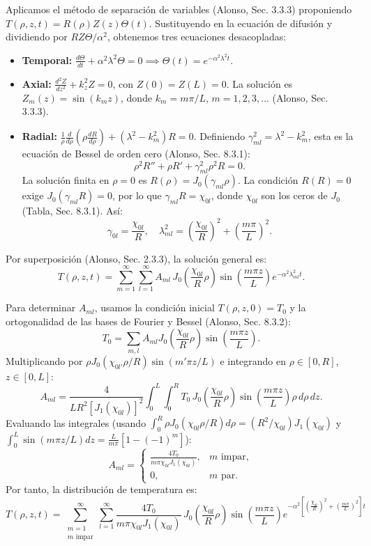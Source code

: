 \documentclass[a4paper]{article}
\begin{document}
Aplicamos el método de separación de variables (Alonso, Sec. 3.3.3) proponiendo $T(\rho,z,t) = R(\rho)Z(z)\Theta(t)$. Sustituyendo en la ecuación de difusión y dividiendo por $RZ\Theta/\alpha^2$, obtenemos tres ecuaciones desacopladas:
\begin{itemize}
\item \textbf{Temporal:} $\displaystyle \frac{d\Theta}{dt} + \alpha^2\lambda^2\Theta = 0 \implies \Theta(t) = e^{-\alpha^2\lambda^2 t}.$
\item \textbf{Axial:} $\displaystyle \frac{d^2Z}{dz^2} + k_z^2 Z = 0$, con $Z(0)=Z(L)=0$. La solución es $Z_m(z) = \sin(k_m z)$, donde $k_m = m\pi/L$, $m = 1,2,3,\dots$ (Alonso, Sec. 3.3.3).
\item \textbf{Radial:} $\displaystyle \frac{1}{\rho}\frac{d}{d\rho}\left(\rho\frac{dR}{d\rho}\right) + (\lambda^2 - k_m^2)R = 0$. Definiendo $\gamma_{ml}^2 = \lambda^2 - k_m^2$, esta es la ecuación de Bessel de orden cero (Alonso, Sec. 8.3.1):
$$\rho^2 R'' + \rho R' + \gamma_{ml}^2\rho^2 R = 0.$$
La solución finita en $\rho=0$ es $R(\rho) = J_0(\gamma_{ml}\rho)$. La condición $R(R)=0$ exige $J_0(\gamma_{ml}R) = 0$, por lo que $\gamma_{ml}R = \chi_{0l}$, donde $\chi_{0l}$ son los ceros de $J_0$ (Tabla, Sec. 8.3.1). Así:
$$\gamma_{0l} = \frac{\chi_{0l}}{R}, \quad \lambda_{ml}^2 = \left(\frac{\chi_{0l}}{R}\right)^2 + \left(\frac{m\pi}{L}\right)^2.$$
\end{itemize}

Por superposición (Alonso, Sec. 2.3.3), la solución general es:
$$T(\rho,z,t) = \sum_{m=1}^{\infty}\sum_{l=1}^{\infty} A_{ml} \, J_0\!\left(\frac{\chi_{0l}}{R}\rho\right) \sin\!\left(\frac{m\pi z}{L}\right) e^{-\alpha^2\lambda_{ml}^2 t}.$$

Para determinar $A_{ml}$, usamos la condición inicial $T(\rho,z,0) = T_0$ y la ortogonalidad de las bases de Fourier y Bessel (Alonso, Sec. 8.3.2):
$$T_0 = \sum_{m,l} A_{ml} J_0\!\left(\frac{\chi_{0l}}{R}\rho\right) \sin\!\left(\frac{m\pi z}{L}\right).$$
Multiplicando por $\rho J_0(\chi_{0l'}\rho/R)\sin(m'\pi z/L)$ e integrando en $\rho\in[0,R]$, $z\in[0,L]$:
$$A_{ml} = \frac{4}{L R^2 [J_1(\chi_{0l})]^2} \int_0^L \int_0^R T_0 \, J_0\!\left(\frac{\chi_{0l}}{R}\rho\right) \sin\!\left(\frac{m\pi z}{L}\right) \rho \, d\rho \, dz.$$
Evaluando las integrales (usando $\int_0^R \rho J_0(\chi_{0l}\rho/R)d\rho = (R^2/\chi_{0l})J_1(\chi_{0l})$ y $\int_0^L \sin(m\pi z/L)dz = \frac{L}{m\pi}[1-(-1)^m]$):
$$A_{ml} = \begin{cases}
\displaystyle \frac{4T_0}{m\pi \chi_{0l} J_1(\chi_{0l})}, & m \text{ impar}, \\
0, & m \text{ par}.
\end{cases}$$
Por tanto, la distribución de temperatura es:
$$\boxed{T(\rho,z,t) = \sum_{\substack{m=1\\ m\text{ impar}}}^{\infty} \sum_{l=1}^{\infty} \frac{4T_0}{m\pi \chi_{0l} J_1(\chi_{0l})} \, J_0\!\left(\frac{\chi_{0l}}{R}\rho\right) \sin\!\left(\frac{m\pi z}{L}\right) e^{-\alpha^2\left[\left(\frac{\chi_{0l}}{R}\right)^2 + \left(\frac{m\pi}{L}\right)^2\right] t}}$$
\end{document}
